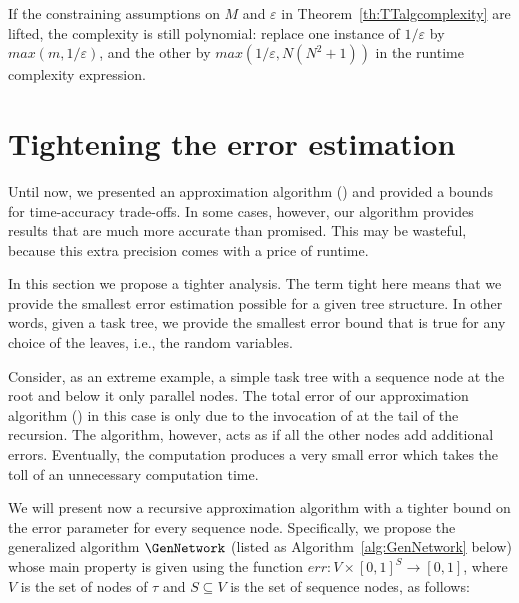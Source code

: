 \documentclass[review]{elsarticle}
\DeclareMathOperator{\Sequence}{Sequence}
\begin{document}
If the constraining assumptions on $M$ and $\varepsilon$ in Theorem~\ref{th:TTalgcomplexity} are lifted, the complexity is still polynomial:
replace one instance of $1/\varepsilon$ by $max(m,1/\varepsilon)$, and the other by $max(1/\varepsilon,N (N^2+1))$
in the runtime complexity expression.

\section{Tightening the error estimation}\label{Chap:Bound}

Until now, we presented an approximation algorithm (\Network) and provided a bounds for time-accuracy trade-offs. In some cases, however, our algorithm provides results that are much more accurate than promised. This may be wasteful, because this extra precision comes with a price of runtime.

In this section we propose a tighter analysis. The term tight here means that we provide the smallest error estimation possible for a given tree structure. In other words, given a task tree, we provide the smallest error bound that is true for any choice of the leaves, i.e., the random variables.


Consider, as an extreme example, a simple task tree with a sequence node at the root and below it only parallel nodes. The total error of our approximation algorithm (\Network) in this case is only due to the invocation of \Sequence at the tail of the recursion. The \Network algorithm, however,  acts as if all the other nodes add additional errors. Eventually, the \Sequence
computation produces a very small error which takes the toll of an unnecessary computation time. 

We will present now a recursive approximation algorithm with a tighter bound on the error parameter for every sequence node. Specifically, we propose the generalized algorithm $\GenNetwork$ (listed as Algorithm~\ref{alg:GenNetwork} below) whose main property is given using the function $err\colon V \times [0,1]^S \to [0,1]$, where $V$ is the set of nodes of $\tau$ and $S \subseteq V$ is the set of sequence nodes, as follows:

\end{document}
